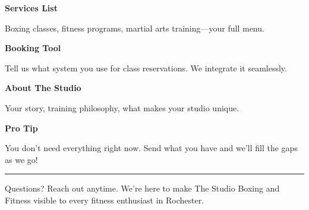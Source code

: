 \documentclass[11pt,letterpaper]{article}
\begin{document}
\hfill
\begin{minipage}[t]{0.48\textwidth}
\begin{tcolorbox}[colframe=accent-teal, boxrule=1pt, left=0.7em, right=0.7em, top=0.5em, bottom=0.5em, arc=4pt, boxsep=0pt]
{\bfseries\small\color{accent-teal}Services List}

\vspace{0.15em}

{\small Boxing classes, fitness programs, martial arts training—your full menu.}
\end{tcolorbox}

\vspace{0.1em}

\begin{tcolorbox}[colframe=accent-teal, boxrule=1pt, left=0.7em, right=0.7em, top=0.5em, bottom=0.5em, arc=4pt, boxsep=0pt]
{\bfseries\small\color{accent-teal}Booking Tool}

\vspace{0.15em}

{\small Tell us what system you use for class reservations. We integrate it seamlessly.}
\end{tcolorbox}

\vspace{0.1em}

\begin{tcolorbox}[colframe=accent-teal, boxrule=1pt, left=0.7em, right=0.7em, top=0.5em, bottom=0.5em, arc=4pt, boxsep=0pt]
{\bfseries\small\color{accent-teal}About The Studio}

\vspace{0.15em}

{\small Your story, training philosophy, what makes your studio unique.}
\end{tcolorbox}

\vspace{-0.2em}
\end{minipage}

\vspace{0.15em}

\begin{tcolorbox}[colback={accent-red!5}, colframe=accent-red!20, boxrule=0.5pt, left=0.7em, right=0.7em, top=0.4em, bottom=0.4em, arc=6pt, boxsep=0pt]

{\bfseries\small\color{accent-red}Pro Tip}

\vspace{0.1em}

{\small You don't need everything right now. Send what you have and we'll fill the gaps as we go!}

\end{tcolorbox}

\vspace{0.15em}

\noindent\hrule
\vspace{0.2em}

{\small\color{text-light}Questions? Reach out anytime. We're here to make The Studio Boxing and Fitness visible to every fitness enthusiast in Rochester.}
\end{document}
